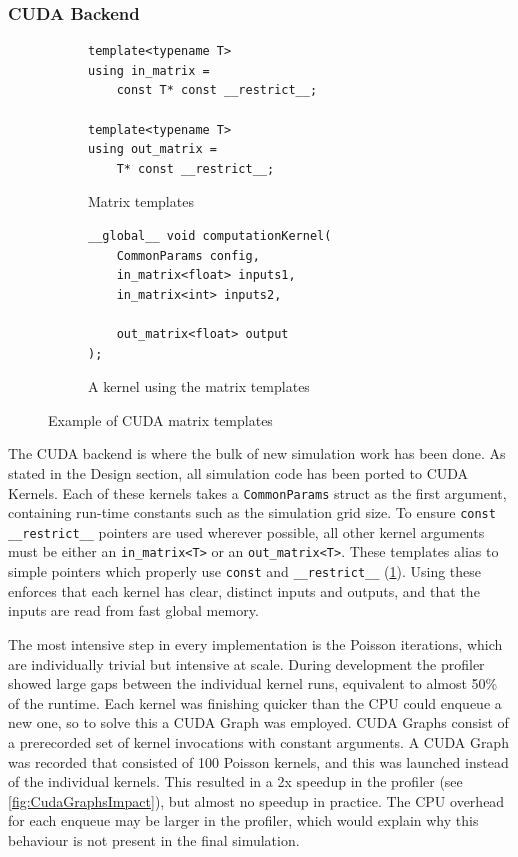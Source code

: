 \subsubsection{CUDA Backend}
\begin{figure}[t]
    \centering
    \begin{subfigure}{0.49\textwidth}
        \begin{verbatim}
template<typename T>
using in_matrix = 
    const T* const __restrict__;

template<typename T>
using out_matrix = 
    T* const __restrict__;
        \end{verbatim}
        \caption{Matrix templates}
    \end{subfigure}%
    \begin{subfigure}{0.49\textwidth}
        \begin{verbatim}
__global__ void computationKernel(
    CommonParams config,
    in_matrix<float> inputs1,
    in_matrix<int> inputs2,
    
    out_matrix<float> output
);
        \end{verbatim}
        \caption{A kernel using the matrix templates}
    \end{subfigure}
    \caption{Example of CUDA matrix templates}
    \label{fig:ImplMatrices}
\end{figure}

The CUDA backend is where the bulk of new simulation work has been done.
As stated in the Design section, all simulation code has been ported to CUDA Kernels.
Each of these kernels takes a \texttt{CommonParams} struct as the first argument, containing run-time constants such as the simulation grid size.
To ensure \texttt{const __restrict__} pointers are used wherever possible, all other kernel arguments must be either an \texttt{in_matrix<T>} or an \texttt{out_matrix<T>}.
These templates alias to simple pointers which properly use \texttt{const} and \texttt{__restrict__} (\cref{fig:ImplMatrices}).
Using these enforces that each kernel has clear, distinct inputs and outputs, and that the inputs are read from fast global memory.

The most intensive step in every implementation is the Poisson iterations, which are individually trivial but intensive at scale.
During development the profiler showed large gaps between the individual kernel runs, equivalent to almost 50\% of the runtime.
Each kernel was finishing quicker than the CPU could enqueue a new one, so to solve this a CUDA Graph was employed.
CUDA Graphs consist of a prerecorded set of kernel invocations with constant arguments.
A CUDA Graph was recorded that consisted of 100 Poisson kernels, and this was launched instead of the individual kernels.
This resulted in a 2x speedup in the profiler (see \cref{fig:CudaGraphsImpact}), but almost no speedup in practice.
The CPU overhead for each enqueue may be larger in the profiler, which would explain why this behaviour is not present in the final simulation.


